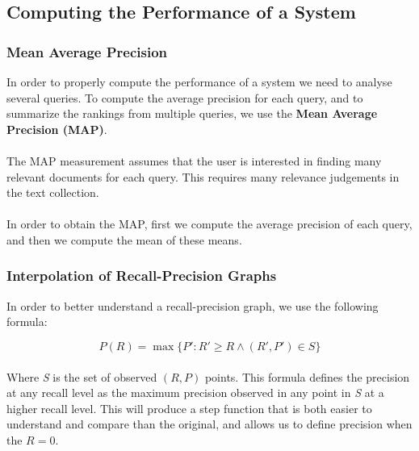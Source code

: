 \documentclass{article}
\begin{document}
\subsection{Computing the Performance of a System}
\subsubsection{Mean Average Precision}
In order to properly compute the performance of a system we need to analyse several queries. To compute the average precision for each query, and to summarize the rankings from multiple queries, we use the \textbf{Mean Average Precision (MAP)}. \\ \\
The MAP measurement assumes that the user is interested in finding many relevant documents for each query. This requires many relevance judgements in the text collection. \\ \\
In order to obtain the MAP, first we compute the average precision of each query, and then we compute the mean of these means.

\subsubsection{Interpolation of Recall-Precision Graphs}
In order to better understand a recall-precision graph, we use the following formula:

\[ P(R) = \max \{ P' : R' \geq R \wedge (R', P') \in S \} \] \\
Where \textit{S} is the set of observed $(R, P)$ points. This formula defines the precision at any recall level as the maximum precision observed in any point in \textit{S} at a higher recall level. This will produce a step function that is both easier to understand and compare than the original, and allows us to define precision when the $R = 0$. \\
\end{document}
